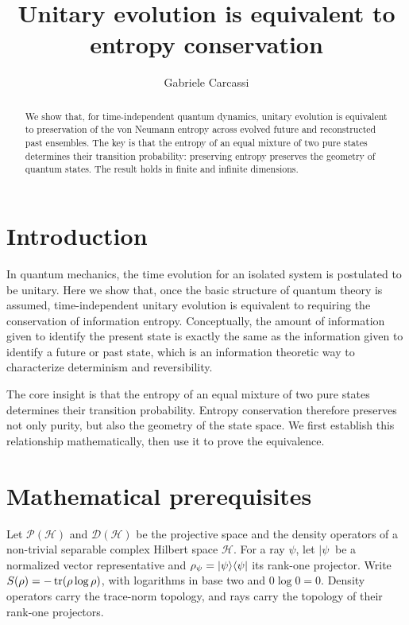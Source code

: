 \documentclass{techbrief}
\title{Unitary evolution is equivalent to entropy conservation}
\author{Gabriele Carcassi}
\begin{document}
\maketitle

\begin{abstract}
	We show that, for time-independent quantum dynamics, unitary evolution is equivalent to preservation of the von Neumann entropy across evolved future and reconstructed past ensembles. The key is that the entropy of an equal mixture of two pure states determines their transition probability: preserving entropy preserves the geometry of quantum states. The result holds in finite and infinite dimensions.
\end{abstract}

\section{Introduction}

In quantum mechanics, the time evolution for an isolated system is postulated to be unitary. Here we show that, once the basic structure of quantum theory is assumed, time-independent unitary evolution is equivalent to requiring the conservation of information entropy. Conceptually, the amount of information given to identify the present state is exactly the same as the information given to identify a future or past state, which is an information theoretic way to characterize determinism and reversibility.

The core insight is that the entropy of an equal mixture of two pure states determines their transition probability. Entropy conservation therefore preserves not only purity, but also the geometry of the state space. We first establish this relationship mathematically, then use it to prove the equivalence.

\section{Mathematical prerequisites}

Let $\mathcal{P}(\mathcal{H})$ and $\mathcal{D}(\mathcal{H})$ be the projective space and the density operators of a non-trivial separable complex Hilbert space $\mathcal{H}$. For a ray $\psi$, let $|\psi\>$ be a normalized vector representative and $\rho_\psi=|\psi\rangle\langle\psi|$ its rank-one projector. Write $S(\rho)=-\operatorname{tr}(\rho\log\rho)$, with logarithms in base two and $0\log0=0$. Density operators carry the trace-norm topology, and rays carry the topology of their rank-one projectors.
\end{document}
